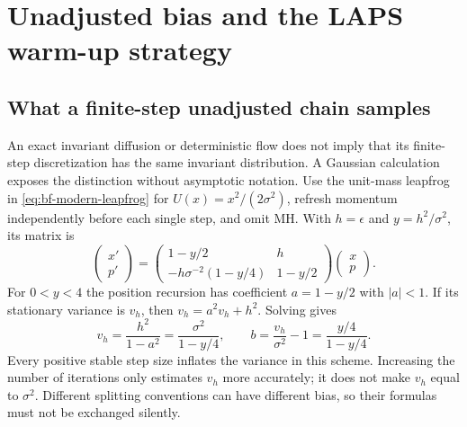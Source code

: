 \section{Unadjusted bias and the LAPS warm-up strategy}
\label{sec:bf-modern-laps}

\subsection{What a finite-step unadjusted chain samples}

An exact invariant diffusion or deterministic flow does not imply that its
finite-step discretization has the same invariant distribution. A Gaussian
calculation exposes the distinction without asymptotic notation. Use the
unit-mass leapfrog in \eqref{eq:bf-modern-leapfrog} for
$U(x)=x^2/(2\sigma^2)$, refresh momentum independently before each single
step, and omit MH. With $h=\epsilon$ and $y=h^2/\sigma^2$, its matrix is
\begin{equation}
 \begin{pmatrix}x'\\p'\end{pmatrix}
 =
 \begin{pmatrix}
  1-y/2 & h\\
  -h\sigma^{-2}(1-y/4)&1-y/2
 \end{pmatrix}
 \begin{pmatrix}x\\p\end{pmatrix}.
 \label{eq:bf-modern-gaussian-leapfrog-matrix}
\end{equation}
For $0<y<4$ the position recursion has coefficient $a=1-y/2$ with
$|a|<1$. If its stationary variance is $v_h$, then
$v_h=a^2v_h+h^2$. Solving gives
\begin{equation}
 v_h=\frac{h^2}{1-a^2}
     =\frac{\sigma^2}{1-y/4},\qquad
 b=\frac{v_h}{\sigma^2}-1=\frac{y/4}{1-y/4}.
 \label{eq:bf-modern-gaussian-biased-variance}
\end{equation}
Every positive stable step size inflates the variance in this scheme.
Increasing the number of iterations only estimates $v_h$ more accurately;
it does not make $v_h$ equal to $\sigma^2$. Different splitting conventions
can have different bias, so their formulas must not be exchanged silently.

